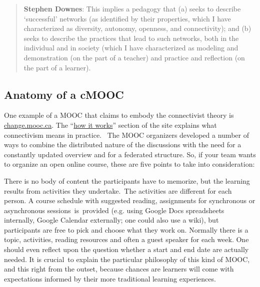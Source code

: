 \begin{quote}
\textbf{Stephen Downes}: This implies a pedagogy that (a) seeks to
describe `successful' networks (as identified by their properties, which
I have characterized as diversity, autonomy, openness, and
connectivity); and (b) seeks to describe the practices that lead to such
networks, both in the individual and in society (which I have
characterized as modeling and demonstration (on the part of a teacher)
and practice and reflection (on the part of a learner).
\end{quote}

\hypertarget{anatomy-of-a-cmooc}{%
\subsection{Anatomy of a cMOOC}\label{anatomy-of-a-cmooc}}

One example of a MOOC that claims to embody the connectivist theory is
\href{http://change.mooc.ca/index.html}{change.mooc.ca}. The
``\href{http://change.mooc.ca/how.htm}{how it works}'' section of the
site explains what connectivism means in practice.~ The MOOC organizers
developed a number of ways to combine the distributed nature of the
discussions with the need for a constantly updated overview and for a
federated structure. So, if your team wants to organize an open online
course, these are five points to take into consideration:

There is no body of content the participants have to memorize, but the
learning results from activities they undertake.~The activities are
different for each person. A course schedule with suggested reading,
assignments for synchronous or asynchronous sessions~is~provided (e.g.
using Google Docs spreadsheets internally, Google Calendar externally;
one could also use a wiki), but participants are free to pick and choose
what they work on. Normally there is a topic, activities, reading
resources and often a guest speaker for each week. One should even
reflect upon the question whether a start and end date are actually
needed. It is crucial~to explain the particular philosophy of this kind
of MOOC, and this right from the outset, because chances are learners
will come with expectations informed by their more traditional learning
experiences.

